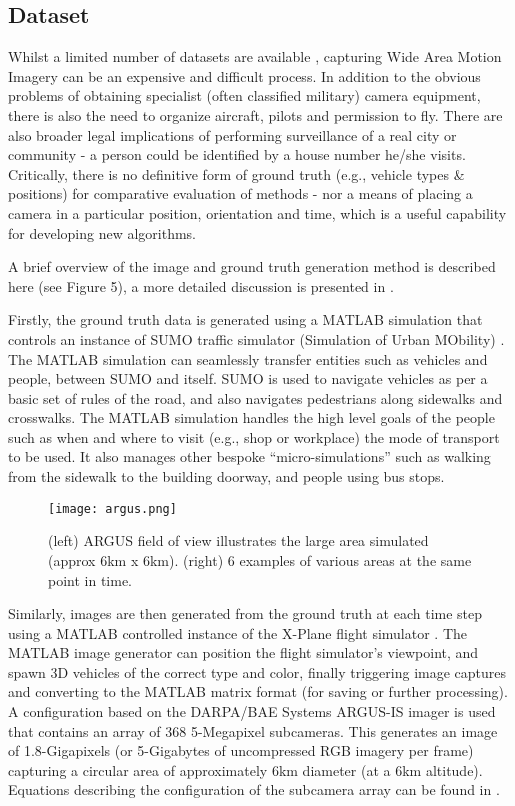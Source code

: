 \documentclass[conference]{IEEEtran}
\begin{document}
\subsection{Dataset}
Whilst a limited number of datasets are available \cite{wamidatasets}, capturing Wide Area Motion Imagery can be an expensive and difficult process.  In addition to the obvious problems of obtaining specialist (often classified military) camera equipment, there is also the need to organize aircraft, pilots and permission to fly.  There are also broader legal implications of performing surveillance of a real city or community - a person could be identified by a house number he/she visits. Critically, there is no definitive form of ground truth (e.g., vehicle types \& positions) for comparative evaluation of methods - nor a means of placing a camera in a particular position, orientation and time, which is a useful capability for developing new algorithms.

A brief overview of the image and ground truth generation method is described here (see Figure 5), a more detailed discussion is presented in \cite{griffith2018}.

Firstly, the ground truth data is generated using a MATLAB simulation that controls an instance of SUMO traffic simulator (Simulation of Urban MObility) \cite{sumo}.  The MATLAB simulation can seamlessly transfer entities such as vehicles and people, between SUMO and itself.  SUMO is used to navigate vehicles as per a basic set of rules of the road, and also navigates pedestrians along sidewalks and crosswalks.  The MATLAB simulation handles the high level goals of the people such as when and where to visit (e.g., shop or workplace) the mode of transport to be used. It also manages other bespoke "`micro-simulations"' such as walking from the sidewalk to the building doorway, and people using bus stops. 

\begin{figure}[!t]
\centerline{\texttt{[image: argus.png]}}
\caption{(left) ARGUS field of view illustrates the large area simulated (approx 6km x 6km). (right) 6 examples of  various areas at the same point in time.}
\label{fig}
\end{figure}

Similarly, images are then generated from the ground truth at each time step using a MATLAB controlled instance of the X-Plane flight simulator \cite{xplanewebsite}.  The MATLAB image generator can position the flight simulator's viewpoint, and spawn 3D vehicles of the correct type and color, finally triggering image captures and converting to the MATLAB matrix format (for saving or further processing).  A configuration based on the DARPA/BAE Systems ARGUS-IS imager \cite{argus} is used that contains an array of 368 5-Megapixel subcameras.  This generates an image of 1.8-Gigapixels (or 5-Gigabytes of uncompressed RGB imagery per frame) capturing a circular area of approximately 6km diameter (at a 6km altitude).  Equations describing the configuration of the subcamera array can be found in \cite{griffith2018}.  
\end{document}
